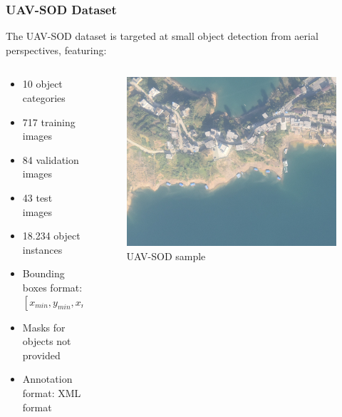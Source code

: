 \documentclass{beamer}
\begin{document}
\begin{frame}[t]
  \frametitle{UAV-SOD Dataset}
  The UAV-SOD dataset is targeted at small object detection from aerial perspectives, featuring:
  \begin{columns}

    \begin{column}{0.5\textwidth}
      \begin{itemize}
        \item 10 object categories
        \item 717 training images 
        \item 84 validation images
        \item 43 test images 
        \item 18.234 object instances
        \item Bounding boxes format: $[x_{min}, y_{min}, x_{max}, y_{max}]$
        \item Masks for objects not provided
        \item Annotation format: XML format
      \end{itemize}
    \end{column}

    \begin{column}{0.5\textwidth}
      \centering
      \begin{figure}
        \includegraphics[scale=0.065]{Figures/uav_example2.jpg}
        \caption{UAV-SOD sample}
        \label{fig:uav-ex}
      \end{figure}
    \end{column}
  \end{columns}
\end{frame}
\end{document}
